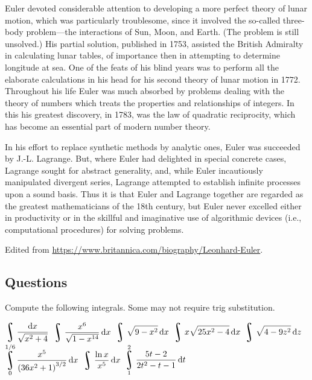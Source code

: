 Euler devoted considerable attention to developing a more perfect theory of lunar motion, which was particularly troublesome, since it involved the so-called three-body problem—the interactions of Sun, Moon, and Earth. (The problem is still unsolved.) His partial solution, published in 1753, assisted the British Admiralty in calculating lunar tables, of importance then in attempting to determine longitude at sea. One of the feats of his blind years was to perform all the elaborate calculations in his head for his second theory of lunar motion in 1772. Throughout his life Euler was much absorbed by problems dealing with the theory of numbers which treats the properties and relationships of integers. In this his greatest discovery, in 1783, was the law of quadratic reciprocity, which has become an essential part of modern number theory.

In his effort to replace synthetic methods by analytic ones, Euler was succeeded by J.-L. Lagrange. But, where Euler had delighted in special concrete cases, Lagrange sought for abstract generality, and, while Euler incautiously manipulated divergent series, Lagrange attempted to establish infinite processes upon a sound basis. Thus it is that Euler and Lagrange together are regarded as the greatest mathematicians of the 18th century, but Euler never excelled either in productivity or in the skillful and imaginative use of algorithmic devices (i.e., computational procedures) for solving problems.

\begin{flushright}
  Edited from \url{https://www.britannica.com/biography/Leonhard-Euler}.
\end{flushright}

\subsection*{Questions}
Compute the following integrals. Some may not require trig substitution.
\begin{questions}
  \question $ \displaystyle\rint \frac{\dif{x}}{\sqrt{x^2 + 4}} $
  \question $ \displaystyle\rint \frac{x^6}{\sqrt{1 - x^{14}}} \dif{x} $
  \question $ \displaystyle\rint \sqrt{9 - x^2} \dif{x} $
  \question $ \displaystyle\rint x \sqrt{25x^2 - 4} \dif{x} $
  \question $ \displaystyle\rint \sqrt{4-9z^2} \dif{z} $
  \question $ \displaystyle\rint^{1/6}_0 \frac{x^5}{\left( 36x^2 + 1 \right)^{3/2}} \dif{x} $
  \question $ \displaystyle\rint \frac{\ln x}{x^5} \dif{x} $
  \question $ \displaystyle\rint^2_1 \frac{5t - 2}{2t^2 - t - 1} \dif{t} $
\end{questions}


